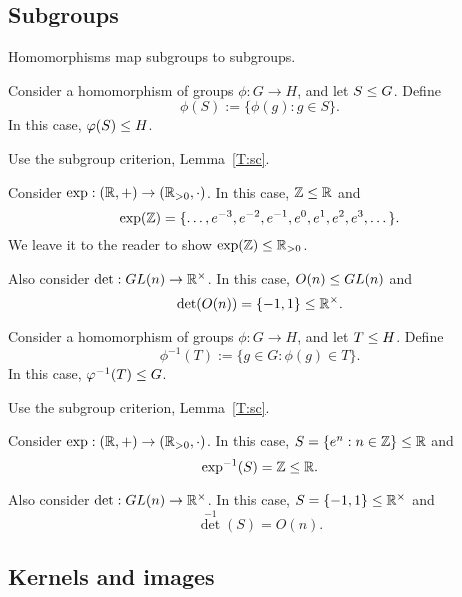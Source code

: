 \documentclass{ximera}
\begin{document}
\subsection{Subgroups}

Homomorphisms map subgroups to subgroups.


\begin{lemma}\label{L:hps}
  Consider a homomorphism of groups $\phi:G\to H$, and let $S\leq
  G$. Define
  \[
  \phi(S) := \{\phi(g): g\in S\}.
  \]
  In this case, $\varphi(S) \leq H$.
  \begin{sketch}
    Use the subgroup criterion, Lemma~\ref{T:sc}.
  \end{sketch}
\end{lemma}


\begin{example}
  Consider $\exp:(\mathbb R,+)\to(\mathbb R_{>0},\cdot)$. In this case,
  $\mathbb Z\leq\mathbb R$ and
  \[
  \exp(\mathbb Z) = \{\dots, e^{-3},e^{-2},e^{-1},e^0,e^1,e^2,e^3,\dots\}.
  \]
  We leave it to the reader to show $\exp(\mathbb Z)\leq \mathbb R_{>0}$.

  

  Also consider $\det:GL(n)\to \mathbb R^\times$. In this case, $O(n) \leq
  GL(n)$ and
  \[
  \det(O(n)) = \{-1,1\}\leq\mathbb R^\times.
  \]
\end{example}




\begin{lemma}\label{L:pps}
  Consider a homomorphism of groups $\phi:G\to H$, and let $T\leq
  H$. Define
  \[
  \phi^{-1}(T) := \{g\in G: \phi(g)\in T\}.
  \]
  In this case, $\varphi^{-1}(T) \leq G$.
  \begin{sketch}
    Use the subgroup criterion, Lemma~\ref{T:sc}.
  \end{sketch}
\end{lemma}

\begin{example}
  Consider $\exp:(\mathbb R,+)\to(\mathbb R_{>0},\cdot)$. In this case,
  $S=\{e^n:n\in\mathbb Z\}\leq\mathbb R$ and
  \[
  \exp^{-1}(S) = \mathbb Z\leq\mathbb R.
  \]

  

  Also consider $\det:GL(n)\to \mathbb R^\times$. In this case,
  $S=\{-1,1\}\leq \mathbb R^\times$ and
  \[
  {\det}^{-1}(S) = O(n).
  \]
\end{example}



\subsection{Kernels and images}
\end{document}
